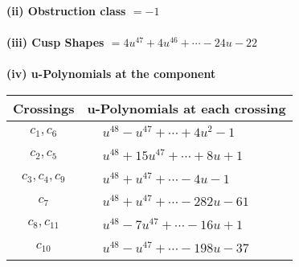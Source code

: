 \documentclass[1p]{elsarticle_modified}
\theoremstyle{definition}
\begin{document}
\flushleft \textbf{(ii) Obstruction class $= -1$}\\~\\
\flushleft \textbf{(iii) Cusp Shapes $= 4 u^{47}+4 u^{46}+\cdots-24 u-22$}\\~\\
\newpage\renewcommand{\arraystretch}{1}
\flushleft \textbf{(iv) u-Polynomials at the component}\newline \\
\begin{tabular}{m{50pt}|m{274pt}}
Crossings & \hspace{64pt}u-Polynomials at each crossing \\
\hline $$\begin{aligned}c_{1},c_{6}\end{aligned}$$&$\begin{aligned}
&u^{48}- u^{47}+\cdots+4 u^2-1
\end{aligned}$\\
\hline $$\begin{aligned}c_{2},c_{5}\end{aligned}$$&$\begin{aligned}
&u^{48}+15 u^{47}+\cdots+8 u+1
\end{aligned}$\\
\hline $$\begin{aligned}c_{3},c_{4},c_{9}\end{aligned}$$&$\begin{aligned}
&u^{48}+u^{47}+\cdots-4 u-1
\end{aligned}$\\
\hline $$\begin{aligned}c_{7}\end{aligned}$$&$\begin{aligned}
&u^{48}+u^{47}+\cdots-282 u-61
\end{aligned}$\\
\hline $$\begin{aligned}c_{8},c_{11}\end{aligned}$$&$\begin{aligned}
&u^{48}-7 u^{47}+\cdots-16 u+1
\end{aligned}$\\
\hline $$\begin{aligned}c_{10}\end{aligned}$$&$\begin{aligned}
&u^{48}- u^{47}+\cdots-198 u-37
\end{aligned}$\\
\hline
\end{tabular}\\~\\
\end{document}
